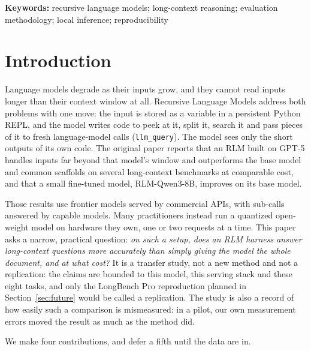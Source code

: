 \documentclass[11pt]{article}
\newcommand{\code}[1]{\texttt{#1}}
\begin{document}
\noindent\textbf{Keywords:} recursive language models; long-context reasoning;
evaluation methodology; local inference; reproducibility

\section{Introduction}
\label{sec:intro}

Language models degrade as their inputs grow, and they cannot read inputs longer
than their context window at all. Recursive Language Models
\citep{zhang2025rlm} address both problems with one move: the input is stored as a
variable in a persistent Python REPL, and the model writes code to peek at it,
split it, search it and pass pieces of it to fresh language-model calls
(\code{llm\_query}). The model sees only the short outputs of its own code. The
original paper reports that an RLM built on GPT-5 handles inputs far beyond that
model's window and outperforms the base model and common scaffolds on several
long-context benchmarks at comparable cost, and that a small fine-tuned model,
RLM-Qwen3-8B, improves on its base model.

Those results use frontier models served by commercial APIs, with sub-calls
answered by capable models. Many practitioners instead run a quantized open-weight
model on hardware they own, one or two requests at a time. This paper asks a
narrow, practical question: \emph{on such a setup, does an RLM harness answer
long-context questions more accurately than simply giving the model the whole
document, and at what cost?} It is a transfer study, not a new method and not a
replication: the claims are bounded to this model, this serving stack and these eight
tasks, and only the LongBench Pro reproduction planned in Section~\ref{sec:future} would
be called a replication. The study is also a record of how easily such a comparison is mismeasured:
in a pilot, our own measurement errors moved the result as much as the method did.

We make four contributions, and defer a fifth until the data are in.
\end{document}
